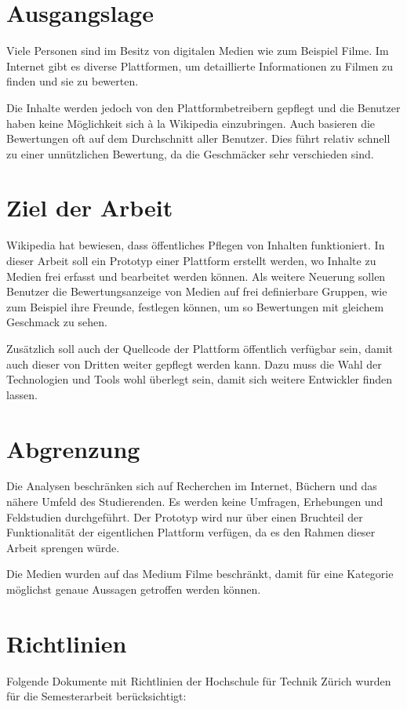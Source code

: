 \section{Ausgangslage}
Viele Personen sind im Besitz von digitalen Medien wie zum Beispiel Filme.
Im Internet gibt es diverse Plattformen, um detaillierte Informationen zu 
Filmen zu finden und sie zu bewerten. 

Die Inhalte werden jedoch von den Plattformbetreibern gepflegt und die 
Benutzer haben keine Möglichkeit sich à la Wikipedia einzubringen. Auch 
basieren die Bewertungen oft auf dem Durchschnitt aller Benutzer. Dies
führt relativ schnell zu einer unnützlichen Bewertung, da die Geschmäcker
sehr verschieden sind.

\section{Ziel der Arbeit}
Wikipedia hat bewiesen, dass öffentliches Pflegen von Inhalten 
funktioniert. In dieser Arbeit soll ein Prototyp einer Plattform erstellt
werden, wo Inhalte zu Medien frei erfasst und bearbeitet werden können.
Als weitere Neuerung sollen Benutzer die Bewertungsanzeige von Medien auf
frei definierbare Gruppen, wie zum Beispiel ihre Freunde, festlegen 
können, um so Bewertungen mit gleichem Geschmack zu sehen.

Zusätzlich soll auch der Quellcode der Plattform öffentlich verfügbar sein, 
damit auch dieser von Dritten weiter gepflegt werden kann. Dazu muss die 
Wahl der Technologien und Tools wohl überlegt sein, damit sich weitere 
Entwickler finden lassen.

\section{Abgrenzung}
Die Analysen beschränken sich auf Recherchen im Internet, Büchern und das 
nähere Umfeld des Studierenden. Es werden keine Umfragen, Erhebungen und 
Feldstudien durchgeführt. Der Prototyp wird nur über einen Bruchteil der 
Funktionalität der eigentlichen Plattform verfügen, da es den Rahmen
dieser Arbeit sprengen würde.

Die Medien wurden auf das Medium Filme beschränkt, damit für eine 
Kategorie möglichst genaue Aussagen getroffen werden können.

\section{Richtlinien}
Folgende Dokumente mit Richtlinien der Hochschule für Technik Zürich 
wurden für die Semesterarbeit berücksichtigt:


